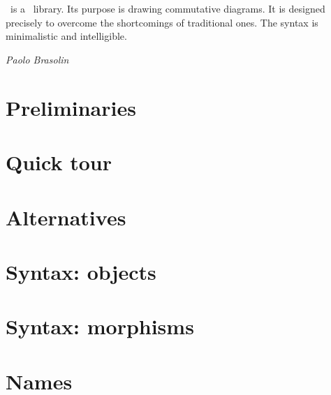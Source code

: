 




\thispagestyle{empty}
\noindent
{}\\[0.62em]
\\[1.62em]
\par
\vfill
{}


\newpage
\noindent\koDi\ is a \TikZ\ library. Its purpose
is drawing commutative diagrams.
It is designed precisely to overcome
the shortcomings of traditional ones.
The syntax is minimalistic and intelligible.\par
\hfill{\itshape Paolo Brasolin}

\newpage
\section{Preliminaries}

\newpage
\section{Quick tour}

\newpage
\section{Alternatives}

\newpage
\section{Syntax: objects}

\newpage
\section{Syntax: morphisms}

\newpage
\section{Names}

\newpage
